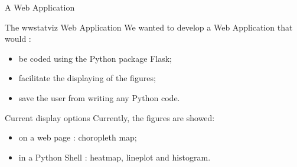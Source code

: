 \begin{frame}{A Web Application}

\begin{block}{The wwstatviz Web Application}
    We wanted to develop a Web Application that would :
  \begin{itemize}
    \item be coded using the Python package Flask;
    \item facilitate the displaying of the figures;
    \item save the user from writing any Python code.
  \end{itemize}

  
\end{block}

\begin{block}{Current display options}
    Currently, the figures are showed: 
    \begin{itemize}
        \item on a web page : choropleth map;
        \item in a Python Shell : heatmap, lineplot and histogram.
  \end{itemize}
\end{block}
  
\end{frame}



